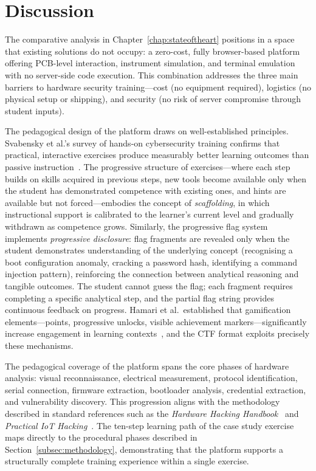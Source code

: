 \section{Discussion}\label{sec:discussion}

The comparative analysis in Chapter~\ref{chap:stateoftheart} positions \pcbctf{} in a space that existing solutions do not occupy: a zero-cost, fully browser-based platform offering PCB-level interaction, instrument simulation, and terminal emulation with no server-side code execution. This combination addresses the three main barriers to hardware security training---cost (no equipment required), logistics (no physical setup or shipping), and security (no risk of server compromise through student inputs).

The pedagogical design of the platform draws on well-established principles. Svabensky et al.'s survey of hands-on cybersecurity training confirms that practical, interactive exercises produce measurably better learning outcomes than passive instruction~\cite{svabensky2020}. The progressive structure of \pcbctf{} exercises---where each step builds on skills acquired in previous steps, new tools become available only when the student has demonstrated competence with existing ones, and hints are available but not forced---embodies the concept of \emph{scaffolding}, in which instructional support is calibrated to the learner's current level and gradually withdrawn as competence grows. Similarly, the progressive flag system implements \emph{progressive disclosure}: flag fragments are revealed only when the student demonstrates understanding of the underlying concept (recognising a boot configuration anomaly, cracking a password hash, identifying a command injection pattern), reinforcing the connection between analytical reasoning and tangible outcomes. The student cannot guess the flag; each fragment requires completing a specific analytical step, and the partial flag string provides continuous feedback on progress. Hamari et al.\ established that gamification elements---points, progressive unlocks, visible achievement markers---significantly increase engagement in learning contexts~\cite{hamari2014}, and the CTF format exploits precisely these mechanisms.

The pedagogical coverage of the platform spans the core phases of hardware analysis: visual reconnaissance, electrical measurement, protocol identification, serial connection, firmware extraction, bootloader analysis, credential extraction, and vulnerability discovery. This progression aligns with the methodology described in standard references such as the \emph{Hardware Hacking Handbook}~\cite{jasper2020hardware} and \emph{Practical IoT Hacking}~\cite{gupta2021practical}. The ten-step learning path of the case study exercise maps directly to the procedural phases described in Section~\ref{subsec:methodology}, demonstrating that the platform supports a structurally complete training experience within a single exercise.

